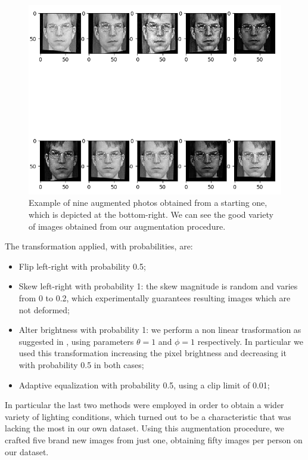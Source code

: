 \begin{figure}[t]
\includegraphics[width=1\linewidth]{images/augmented.png}
\caption{Example of nine augmented photos obtained from a starting one, which is depicted at the bottom-right. We can see the good variety of images obtained from our augmentation procedure.}
\label{fig:long}
\label{fig:onecol}
\end{figure}

The transformation applied, with probabilities, are:
\begin{itemize}
\item Flip left-right with probability 0.5;
\item Skew left-right with probability 1: the skew magnitude is random and varies from 0 to 0.2, which experimentally guarantees resulting images which are not deformed;
\item Alter brightness with probability 1: we perform a non linear trasformation as suggested in \cite{nonlintransf}, using parameters $\theta = 1$ and $\phi = 1$ respectively. In particular we used this transformation increasing the pixel brightness and decreasing it with probability 0.5 in both cases;
\item Adaptive equalization \cite{histeq} with probability 0.5, using a clip limit of 0.01;
\end{itemize}
In particular the last two methods were employed in order to obtain a wider variety of lighting conditions, which turned out to be a characteristic that was lacking the most in our own dataset.
Using this augmentation procedure, we crafted five brand new images from just one, obtaining fifty images per person on our dataset.

